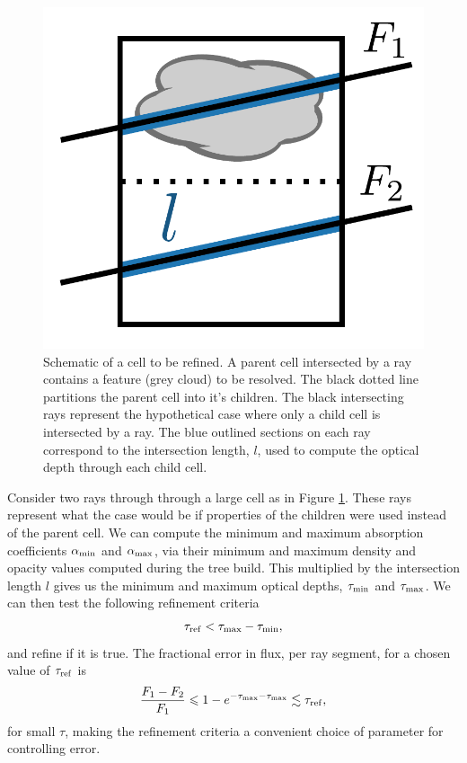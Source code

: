 \documentclass[fleq,usenatbib]{mnras}
\newcommand{\tr}{\tau_{\rm ref}}
\begin{document}
\begin{figure}
\includegraphics[width=1\linewidth]{Figures/refine.pdf}
\caption{Schematic of a cell to be refined. A parent cell intersected by a ray 
contains a feature (grey cloud) to be resolved. The black dotted line 
partitions the parent cell into it's children. The black intersecting rays 
represent the hypothetical case where only a child cell is intersected by a 
ray. The blue outlined sections on each ray correspond to the intersection 
length, $l$,  used to compute the optical depth through each child cell.}
\label{fig:refine}
\end{figure}
Consider two rays through through a large cell as in Figure \ref{fig:refine}. 
These rays represent what the case would be if properties of the children were 
used instead of the parent cell. We can compute the minimum and maximum 
absorption coefficients $\alpha_{\rm min}$ and $\alpha_{\rm max}$, via their 
minimum and maximum density and opacity values computed during the tree build. 
This multiplied by the intersection length $l$ gives us the minimum and 
maximum optical depths, $\tau_{\rm min}$ and $\tau_{\rm max}$. We can then 
test the following refinement criteria
\begin{equation}
\label{eqn:refcrit}
\tr < \tau_{\rm max} - \tau_{\rm min},
\end{equation}
and refine if it is true. The fractional error in flux, per ray segment, for a 
chosen value of $\tr$ is
\begin{equation}
\label{eqn:reffrac}
\frac{F_1 - F_2}{F_1} \leq 1 - e^{-\tau_{\rm max}-\tau_{\rm max}} 
\lesssim \tr,
\end{equation}
for small $\tau$, making the refinement criteria a convenient choice of 
parameter for controlling error.
\end{document}

